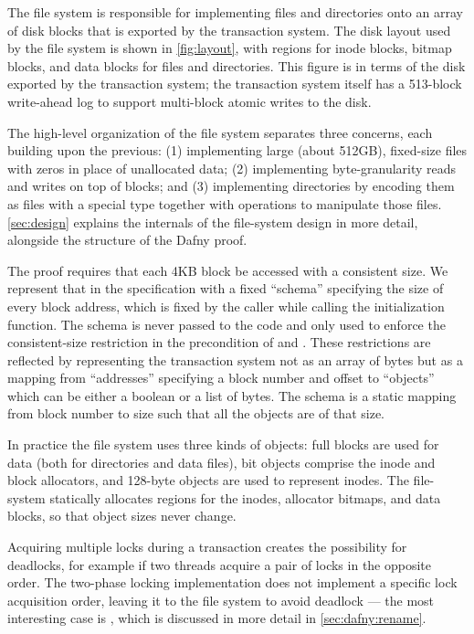 The file system is responsible for implementing files and directories
onto an array of disk blocks that is exported by the transaction
system.  The disk layout used by the file system is shown in
\autoref{fig:layout}, with regions for inode blocks, bitmap blocks,
and data blocks for files and directories. This figure is in terms of
the disk exported by the transaction system; the transaction system
itself has a 513-block write-ahead log to support multi-block atomic
writes to the disk.

The high-level organization of the file system separates three concerns, each
building upon the previous: (1) implementing large (about 512GB), fixed-size
files with zeros in place of unallocated data; (2) implementing byte-granularity
reads and writes on top of blocks; and (3) implementing
directories by encoding them as files with a special type together with
operations to manipulate those files. \autoref{sec:design} explains the
internals of the file-system design in more detail, alongside the structure of
the Dafny proof.


The proof requires that each 4KB block be accessed with a consistent size. We
represent that in the specification with a fixed ``schema'' specifying the
size of every block address, which is fixed by the caller while calling the
initialization function. The schema is never passed to the code and only used
to enforce the consistent-size restriction in the precondition of 
and . These restrictions are reflected by representing the
transaction system not as an array of bytes but as a mapping from
``addresses'' specifying a block number and offset to ``objects'' which can be
either a boolean or a list of bytes. The schema is a static mapping from block
number to size such that all the objects are of that size.

In practice the file system uses three kinds of objects: full blocks are used
for data (both for directories and data files), bit objects comprise the inode
and block allocators, and 128-byte objects are used to represent inodes. The
file-system statically allocates regions for the inodes, allocator bitmaps,
and data blocks, so that object sizes never change.

Acquiring multiple locks during a transaction creates the possibility
for deadlocks, for example if two threads acquire a pair of locks in the opposite
order. The two-phase locking implementation does not implement a
specific lock acquisition order, leaving it to the file system to
avoid deadlock --- the most interesting case is , which is discussed
in more detail in \autoref{sec:dafny:rename}.
